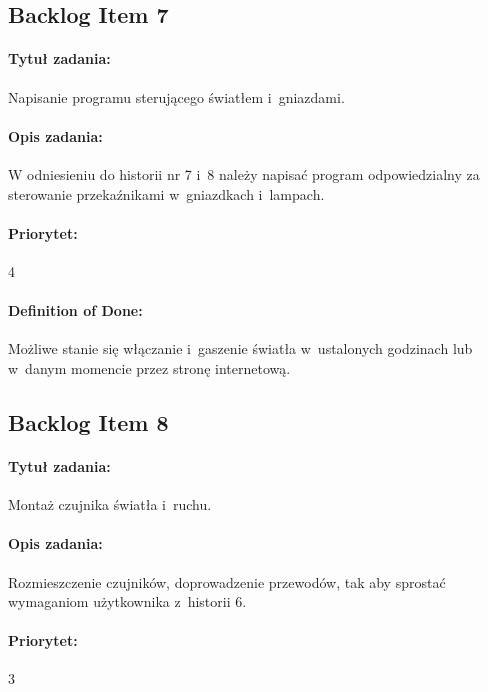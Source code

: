 
	\subsection{Backlog Item 7}
	\paragraph{Tytuł zadania:} 
	Napisanie programu sterującego światłem i~gniazdami.
	
	\paragraph{Opis zadania:} 
	W odniesieniu do historii nr 7 i~8 należy napisać program odpowiedzialny za sterowanie przekaźnikami w~gniazdkach i~lampach.
	
	\paragraph{Priorytet:}
	4
	
	\paragraph{Definition of Done:}
	Możliwe stanie się włączanie i~gaszenie światła w~ustalonych godzinach lub w~danym momencie przez stronę internetową.


	\subsection{Backlog Item 8}
	\paragraph{Tytuł zadania:}
	Montaż czujnika światła i~ruchu.
	
	\paragraph{Opis zadania:} 
	Rozmieszczenie czujników, doprowadzenie przewodów, tak aby sprostać wymaganiom użytkownika z~historii 6. 
	
	\paragraph{Priorytet:}
	3
	
